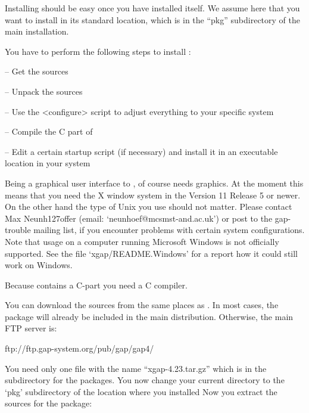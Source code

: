 
Installing {\XGAP} should be easy once you have installed {\GAP} itself. We
assume here that you want to install {\XGAP} in its standard location,
which is in the ``pkg'' subdirectory of the main {} installation.


You have to perform the following steps to install {\XGAP}:

\beginlist
\item{--} Get the sources
\item{--} Unpack the sources
\item{--} Use the <configure> script to adjust everything to your specific
  system
\item{--} Compile the C part of {\XGAP}
\item{--} Edit a certain startup script (if necessary) and install it in 
      an executable location in your system
\endlist


Being a graphical user interface to {\GAP}, {\XGAP} of course needs
graphics. At the moment this means that you need the X window system in the 
Version 11 Release 5 or newer. On the other hand the type of Unix you use 
should not matter. Please contact Max Neunh\accent127offer (email:
`neunhoef@mcsmst-and.ac.uk') or post to the gap-trouble  
mailing list, if you encounter problems with certain system configurations.
Note that usage on 
a computer running Microsoft Windows is not officially supported. 
See the file `xgap/README.Windows' for a report how it could
still work on Windows. 

Because {\XGAP} contains a C-part you need a C compiler.


You can download the sources from the same places as {\GAP}. In most cases,
the {\XGAP} package will already be included in the main distribution.
Otherwise, the main FTP server is:

\begintt
ftp://ftp.gap-system.org/pub/gap/gap4/
\endtt

You need only one file with the name ``xgap-4.23.tar.gz''
which is in the subdirectory for the packages.
You now change your current directory to the `pkg' subdirectory of the 
location where you installed
{\GAP}
Now you extract the sources for the {\XGAP} package:

